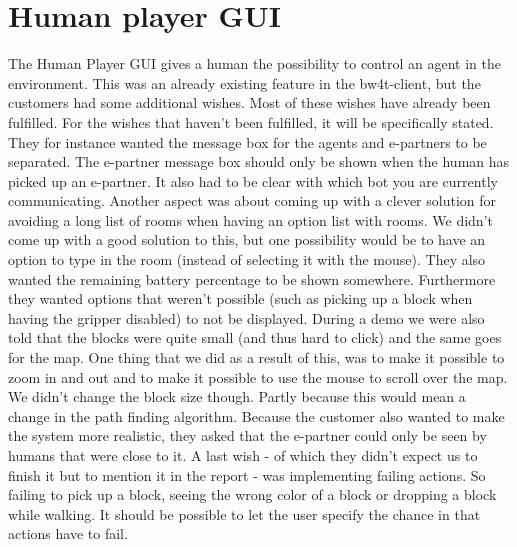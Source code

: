\section{Human player GUI}
The Human Player GUI gives a human the possibility to control an agent in the environment. This was an already existing feature in the bw4t-client, but the customers had some additional wishes.
Most of these wishes have already been fulfilled. For the wishes that haven't been fulfilled, it will be specifically stated. They for instance wanted the message box for the agents and e-partners to be separated. The e-partner message box should only be shown when the human has picked up an e-partner. It also had to be clear with which bot you are currently communicating.
Another aspect was about coming up with a clever solution for avoiding a long list of rooms when having an option list with rooms. We didn't come up with a good solution to this, but one possibility would be to have an option to type in the room (instead of selecting it with the mouse).
They also wanted the remaining battery percentage to be shown somewhere. Furthermore they wanted options that weren't possible (such as picking up a block when having the gripper disabled) to not be displayed. During a demo we were also told that the blocks were quite small (and thus hard to click) and the same goes for the map. One thing that we did as a result of this, was to make it possible to zoom in and out and to make it possible to use the mouse to scroll over the map. We didn't change the block size though. Partly because this would mean a change in the path finding algorithm.
Because the customer also wanted to make the system more realistic, they asked that the e-partner could only be seen by humans that were close to it.
A last wish - of which they didn't expect us to finish it but to mention it in the report - was implementing failing actions. So failing to pick up a block, seeing the wrong color of a block or dropping a block while walking. It should be possible to let the user specify the chance in  that actions have to fail.